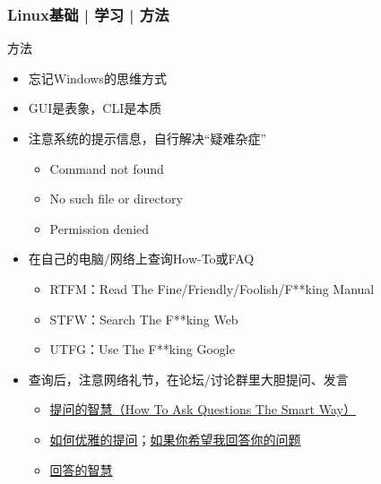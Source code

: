 \begin{frame}
  \frametitle{Linux基础 | 学习 | 方法}
  \begin{block}{方法}
    \begin{itemize}[<+->]
      \item 忘记Windows的思维方式
      \item GUI是表象，CLI是本质
      \item 注意系统的提示信息，自行解决“疑难杂症”
      \begin{itemize}
        \item Command not found
        \item No such file or directory
        \item Permission denied
      \end{itemize}
      \item 在自己的电脑/网络上查询How-To或FAQ
      \begin{itemize}
        \item RTFM：Read The Fine/Friendly/Foolish/F**king Manual
        \item STFW：Search The F**king Web
        \item UTFG：Use The F**king Google
      \end{itemize}
      \item 查询后，注意网络礼节，在论坛/讨论群里大胆提问、发言
      \begin{itemize}
        \item \href{https://github.com/ryanhanwu/How-To-Ask-Questions-The-Smart-Way/blob/master/README-zh_CN.md}{提问的智慧（How To Ask Questions The Smart Way）}
        \item \href{https://blog.csdn.net/woodcorpse/article/details/78279960}{如何优雅的提问}；\href{http://www.bio-info-trainee.com/1761.html}{如果你希望我回答你的问题}
        \item \href{https://blog.m157q.tw/posts/2017/12/21/how-to-answer-questions-in-a-helpful-way-zh-tw/}{回答的智慧}
      \end{itemize}
    \end{itemize}
  \end{block}
\end{frame}

